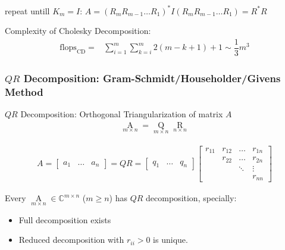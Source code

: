     repeat untill $ K_m=I $: $ A=(R_mR_{m-1}\ldots R_1)^*I(R_mR_{m-1}\ldots R_1)=R^*R $
    
    Complexity of Cholesky Decomposition:
    \begin{align}
        \mathrm{flops}_\mathrm{CD}=&\sum_{i=1}^{m}\sum_{k=i}^m 2(m-k+1)+1 \sim \dfrac{1}{3}m^3
    \end{align}
 
    
    









    



\subsubsection{$ QR $ Decomposition: Gram-Schmidt/Householder/Givens Method}
    
    $ QR $ Decomposition: Orthogonal Triangularization of matrix $ A $
\begin{align}
    \mathop{A}\limits_{m\times n} =\mathop{Q}\limits_{m\times n} \mathop{R}\limits_{n\times n}     
\end{align}


\begin{align}
    A=\begin{bmatrix}
        a_1&\ldots &a_n
    \end{bmatrix} 
    =QR=
    \begin{bmatrix}
        q_1&\ldots&q_n
    \end{bmatrix}
    \begin{bmatrix}
        r_{11}&r_{12}&\ldots&r_{1n}\\
        &r_{22}&\ldots&r_{2n}\\
        &&\ddots&\vdots\\
        &&&r_{nn}
    \end{bmatrix}
\end{align}

    Every $ \mathop{A}\limits_{m\times n} \in \mathbb{C}^{m\times n} $ ($ m\geq n $) has $ QR $ decomposition, specially:
    \begin{itemize}[topsep=2pt,itemsep=0pt]
        \item Full decomposition exists
        \item Reduced decomposition with $ r_{ii}>0 $ is unique.
    \end{itemize}
    
